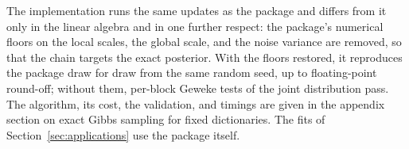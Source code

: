The implementation runs the same updates as the package and differs from it only in the linear algebra and in one further respect: the package's numerical floors on the local scales, the global scale, and the noise variance are removed, so that the chain targets the exact posterior. With the floors restored, it reproduces the package draw for draw from the same random seed, up to floating-point round-off; without them, per-block Geweke tests of the joint distribution pass. The algorithm, its cost, the validation, and timings are given in the appendix section on exact Gibbs sampling for fixed dictionaries. The fits of Section~\ref{sec:applications} use the package itself.
